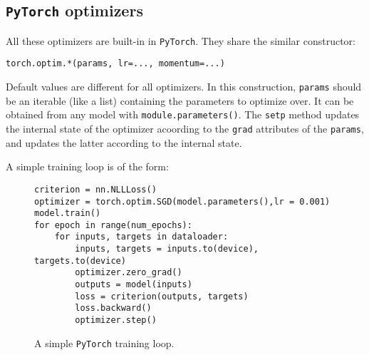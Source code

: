 \subsection{\texttt{PyTorch} optimizers}
All these optimizers are built-in in \texttt{PyTorch}. They share the similar constructor:
\begin{center}
    \texttt{torch.optim.*(params, lr=..., momentum=...)}
\end{center}
Default values are different for all optimizers. In this construction, \texttt{params} should be an iterable (like a list) containing the parameters to optimize over. It can be obtained from any model with \texttt{module.parameters()}. The \texttt{setp} method updates the internal state of the optimizer acoording to the \texttt{grad} attributes of the \texttt{params}, and updates the latter according to the internal state.

A simple training loop is of the form:
\begin{figure}[H]
    \centering
    \begin{minipage}[t]{.7\textwidth}
        \begin{verbatim}
criterion = nn.NLLLoss()
optimizer = torch.optim.SGD(model.parameters(),lr = 0.001)
model.train()
for epoch in range(num_epochs):
    for inputs, targets in dataloader:
        inputs, targets = inputs.to(device), targets.to(device)
        optimizer.zero_grad()
        outputs = model(inputs)
        loss = criterion(outputs, targets)
        loss.backward()
        optimizer.step()
        \end{verbatim}
        \caption{A simple \texttt{PyTorch} training loop.}
    \end{minipage}
\end{figure}